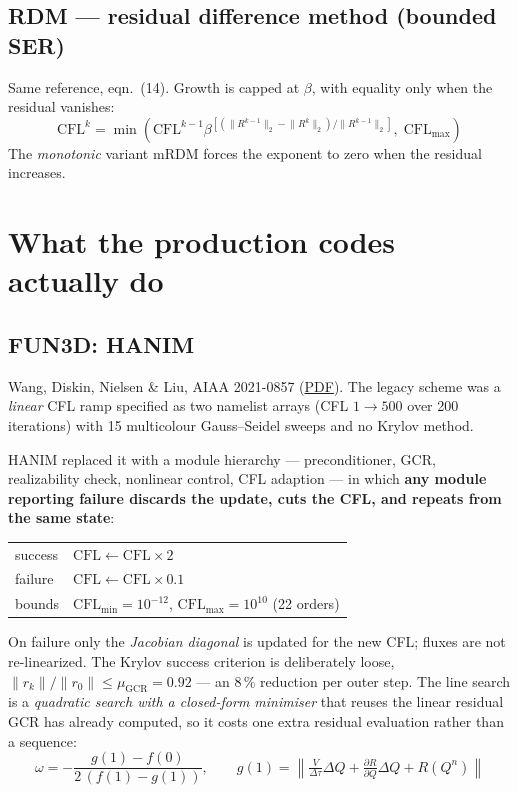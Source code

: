 \documentclass[11pt,a4paper]{article}
\begin{document}
\subsection{RDM --- residual difference method (bounded SER)}
Same reference, eqn.~(14). Growth is capped at $\beta$, with equality only when the residual
vanishes:
\begin{equation}
\mathrm{CFL}^k = \min\!\left( \mathrm{CFL}^{k-1}
\beta^{\left[(\lVert R^{k-1}\rVert_2 - \lVert R^{k}\rVert_2)/\lVert R^{k-1}\rVert_2\right]},\;
\mathrm{CFL}_{\max}\right)
\end{equation}
The \emph{monotonic} variant mRDM forces the exponent to zero when the residual increases.

\section{What the production codes actually do}

\subsection{FUN3D: HANIM}
Wang, Diskin, Nielsen \& Liu, AIAA 2021-0857
(\href{https://ntrs.nasa.gov/api/citations/20205010283/downloads/fun3d_hanim.pdf}{PDF}). The
legacy scheme was a \emph{linear} CFL ramp specified as two namelist arrays (CFL $1 \to 500$
over 200 iterations) with 15 multicolour Gauss--Seidel sweeps and no Krylov method.

HANIM replaced it with a module hierarchy --- preconditioner, GCR, realizability check,
nonlinear control, CFL adaption --- in which \textbf{any module reporting failure discards the
update, cuts the CFL, and repeats from the same state}:
\begin{center}
\begin{tabular}{@{}ll@{}}
\toprule
success & $\mathrm{CFL} \leftarrow \mathrm{CFL} \times 2$ \\
failure & $\mathrm{CFL} \leftarrow \mathrm{CFL} \times 0.1$ \\
bounds  & $\mathrm{CFL}_{\min} = 10^{-12}$, $\mathrm{CFL}_{\max} = 10^{10}$ \quad (22 orders) \\
\bottomrule
\end{tabular}
\end{center}
On failure only the \emph{Jacobian diagonal} is updated for the new CFL; fluxes are not
re-linearized. The Krylov success criterion is deliberately loose,
$\lVert r_k\rVert/\lVert r_0\rVert \le \mu_{\mathrm{GCR}} = 0.92$ --- an 8\,\% reduction per
outer step. The line search is a \emph{quadratic search with a closed-form minimiser} that
reuses the linear residual GCR has already computed, so it costs one extra residual
evaluation rather than a sequence:
\begin{equation}
\omega = -\frac{g(1)-f(0)}{2\,(f(1)-g(1))},\qquad
g(1) = \left\lVert \tfrac{V}{\Delta\tau}\Delta Q + \tfrac{\partial R}{\partial Q}\Delta Q + R(Q^n)\right\rVert
\end{equation}
\end{document}
